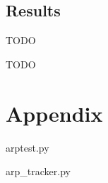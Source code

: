 \documentclass{article}
\begin{document}
\subsection{Results}
TODO

\begin{thebibliography}{1}

\end{thebibliography}

TODO

\section{Appendix}
\begin{tiny}
	\begin{framed}
		arptest.py
		
	\end{framed}
	
	\begin{framed}
		arp\_tracker.py
		
	\end{framed}
\end{tiny}
\end{document}
